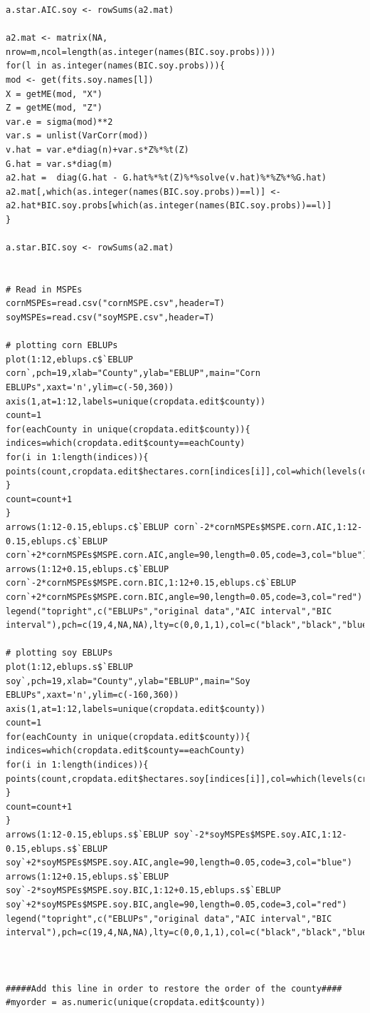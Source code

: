 \documentclass{article}
\begin{document}
\begin{Verbatim}[fontsize=\tiny]
a.star.AIC.soy <- rowSums(a2.mat)

a2.mat <- matrix(NA, nrow=m,ncol=length(as.integer(names(BIC.soy.probs))))
for(l in as.integer(names(BIC.soy.probs))){
mod <- get(fits.soy.names[l])
X = getME(mod, "X")
Z = getME(mod, "Z")
var.e = sigma(mod)**2
var.s = unlist(VarCorr(mod))
v.hat = var.e*diag(n)+var.s*Z%*%t(Z)
G.hat = var.s*diag(m)
a2.hat =  diag(G.hat - G.hat%*%t(Z)%*%solve(v.hat)%*%Z%*%G.hat)
a2.mat[,which(as.integer(names(BIC.soy.probs))==l)] <- a2.hat*BIC.soy.probs[which(as.integer(names(BIC.soy.probs))==l)]
}

a.star.BIC.soy <- rowSums(a2.mat)


# Read in MSPEs
cornMSPEs=read.csv("cornMSPE.csv",header=T)
soyMSPEs=read.csv("soyMSPE.csv",header=T)

# plotting corn EBLUPs
plot(1:12,eblups.c$`EBLUP corn`,pch=19,xlab="County",ylab="EBLUP",main="Corn EBLUPs",xaxt='n',ylim=c(-50,360))
axis(1,at=1:12,labels=unique(cropdata.edit$county))
count=1
for(eachCounty in unique(cropdata.edit$county)){
indices=which(cropdata.edit$county==eachCounty)
for(i in 1:length(indices)){
points(count,cropdata.edit$hectares.corn[indices[i]],col=which(levels(cropdata.edit$county)==eachCounty),pch=4)
}
count=count+1
}
arrows(1:12-0.15,eblups.c$`EBLUP corn`-2*cornMSPEs$MSPE.corn.AIC,1:12-0.15,eblups.c$`EBLUP corn`+2*cornMSPEs$MSPE.corn.AIC,angle=90,length=0.05,code=3,col="blue")
arrows(1:12+0.15,eblups.c$`EBLUP corn`-2*cornMSPEs$MSPE.corn.BIC,1:12+0.15,eblups.c$`EBLUP corn`+2*cornMSPEs$MSPE.corn.BIC,angle=90,length=0.05,code=3,col="red")
legend("topright",c("EBLUPs","original data","AIC interval","BIC interval"),pch=c(19,4,NA,NA),lty=c(0,0,1,1),col=c("black","black","blue","red"))

# plotting soy EBLUPs
plot(1:12,eblups.s$`EBLUP soy`,pch=19,xlab="County",ylab="EBLUP",main="Soy EBLUPs",xaxt='n',ylim=c(-160,360))
axis(1,at=1:12,labels=unique(cropdata.edit$county))
count=1
for(eachCounty in unique(cropdata.edit$county)){
indices=which(cropdata.edit$county==eachCounty)
for(i in 1:length(indices)){
points(count,cropdata.edit$hectares.soy[indices[i]],col=which(levels(cropdata.edit$county)==eachCounty),pch=4)
}
count=count+1
}
arrows(1:12-0.15,eblups.s$`EBLUP soy`-2*soyMSPEs$MSPE.soy.AIC,1:12-0.15,eblups.s$`EBLUP soy`+2*soyMSPEs$MSPE.soy.AIC,angle=90,length=0.05,code=3,col="blue")
arrows(1:12+0.15,eblups.s$`EBLUP soy`-2*soyMSPEs$MSPE.soy.BIC,1:12+0.15,eblups.s$`EBLUP soy`+2*soyMSPEs$MSPE.soy.BIC,angle=90,length=0.05,code=3,col="red")
legend("topright",c("EBLUPs","original data","AIC interval","BIC interval"),pch=c(19,4,NA,NA),lty=c(0,0,1,1),col=c("black","black","blue","red"))



#####Add this line in order to restore the order of the county####
#myorder = as.numeric(unique(cropdata.edit$county))




\end{Verbatim}
\end{document}
